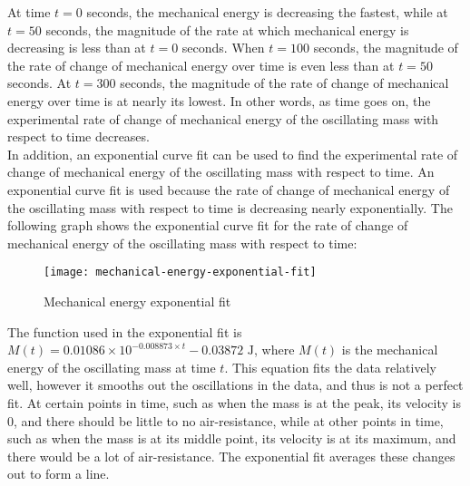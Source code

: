 \documentclass[titlepage]{article}
\begin{document}
                At time $t=0$ seconds, the mechanical energy is decreasing the fastest, while at $t=50$ seconds, the magnitude of the rate at which mechanical energy is decreasing is less than at $t=0$ seconds.
                When $t=100$ seconds, the magnitude of the rate of change of mechanical energy over time is even less than at $t=50$ seconds.
                At $t=300$ seconds, the magnitude of the rate of change of mechanical energy over time is at nearly its lowest.
                In other words, as time goes on, the experimental rate of change of mechanical energy of the oscillating mass with respect to time decreases. \\
                
                In addition, an exponential curve fit can be used to find the experimental rate of change of mechanical energy of the oscillating mass with respect to time.
                An exponential curve fit is used because the rate of change of mechanical energy of the oscillating mass with respect to time is decreasing nearly exponentially.
                The following graph shows the exponential curve fit for the rate of change of mechanical energy of the oscillating mass with respect to time:
                
                \begin{figure}[H]
                    \centering
                    \texttt{[image: mechanical-energy-exponential-fit]}
                    \caption{Mechanical energy exponential fit}
                    \label{fig:mechanical-energy-exponential-fit}
                \end{figure}

                The function used in the exponential fit is $M(t) = 0.01086 \times 10^{-0.008873 \times t} - 0.03872 \text{ J}$, where $M(t)$ is the mechanical energy of the oscillating mass at time $t$.
                This equation fits the data relatively well, however it smooths out the oscillations in the data, and thus is not a perfect fit.
                At certain points in time, such as when the mass is at the peak, its velocity is 0, and there should be little to no air-resistance, while at other points in time, such as when the mass is at its middle point, its velocity is at its maximum, and there would be a lot of air-resistance.
                The exponential fit averages these changes out to form a line.
                
\end{document}
